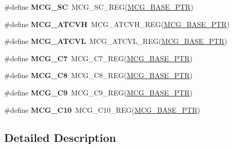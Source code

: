 \begin{DoxyCompactItemize}
\#define {\bfseries M\+C\+G\+\_\+\+SC}~M\+C\+G\+\_\+\+S\+C\+\_\+\+R\+EG(\hyperlink{group___m_c_g___peripheral_gaceefc72e93a47a35f59a31c57dddf41b}{M\+C\+G\+\_\+\+B\+A\+S\+E\+\_\+\+P\+TR})
\item 
\mbox{\label{group___m_c_g___register___accessor___macros_ga1cb18ffdb73d4eaad4573563aec49be0}} 
\#define {\bfseries M\+C\+G\+\_\+\+A\+T\+C\+VH}~M\+C\+G\+\_\+\+A\+T\+C\+V\+H\+\_\+\+R\+EG(\hyperlink{group___m_c_g___peripheral_gaceefc72e93a47a35f59a31c57dddf41b}{M\+C\+G\+\_\+\+B\+A\+S\+E\+\_\+\+P\+TR})
\item 
\mbox{\label{group___m_c_g___register___accessor___macros_ga4999439546569874f8c31b012637d15f}} 
\#define {\bfseries M\+C\+G\+\_\+\+A\+T\+C\+VL}~M\+C\+G\+\_\+\+A\+T\+C\+V\+L\+\_\+\+R\+EG(\hyperlink{group___m_c_g___peripheral_gaceefc72e93a47a35f59a31c57dddf41b}{M\+C\+G\+\_\+\+B\+A\+S\+E\+\_\+\+P\+TR})
\item 
\mbox{\label{group___m_c_g___register___accessor___macros_ga9fc6058dcffc6506763ff7235669038c}} 
\#define {\bfseries M\+C\+G\+\_\+\+C7}~M\+C\+G\+\_\+\+C7\+\_\+\+R\+EG(\hyperlink{group___m_c_g___peripheral_gaceefc72e93a47a35f59a31c57dddf41b}{M\+C\+G\+\_\+\+B\+A\+S\+E\+\_\+\+P\+TR})
\item 
\mbox{\label{group___m_c_g___register___accessor___macros_ga4328cf0c21c1c85cc0d618f7762016b8}} 
\#define {\bfseries M\+C\+G\+\_\+\+C8}~M\+C\+G\+\_\+\+C8\+\_\+\+R\+EG(\hyperlink{group___m_c_g___peripheral_gaceefc72e93a47a35f59a31c57dddf41b}{M\+C\+G\+\_\+\+B\+A\+S\+E\+\_\+\+P\+TR})
\item 
\mbox{\label{group___m_c_g___register___accessor___macros_ga40ae99ab2fbda74612a8f3f6bab361e0}} 
\#define {\bfseries M\+C\+G\+\_\+\+C9}~M\+C\+G\+\_\+\+C9\+\_\+\+R\+EG(\hyperlink{group___m_c_g___peripheral_gaceefc72e93a47a35f59a31c57dddf41b}{M\+C\+G\+\_\+\+B\+A\+S\+E\+\_\+\+P\+TR})
\item 
\mbox{\label{group___m_c_g___register___accessor___macros_gab582a1281f6376c0dd52e62c3e22653e}} 
\#define {\bfseries M\+C\+G\+\_\+\+C10}~M\+C\+G\+\_\+\+C10\+\_\+\+R\+EG(\hyperlink{group___m_c_g___peripheral_gaceefc72e93a47a35f59a31c57dddf41b}{M\+C\+G\+\_\+\+B\+A\+S\+E\+\_\+\+P\+TR})
\end{DoxyCompactItemize}


\subsection{Detailed Description}
